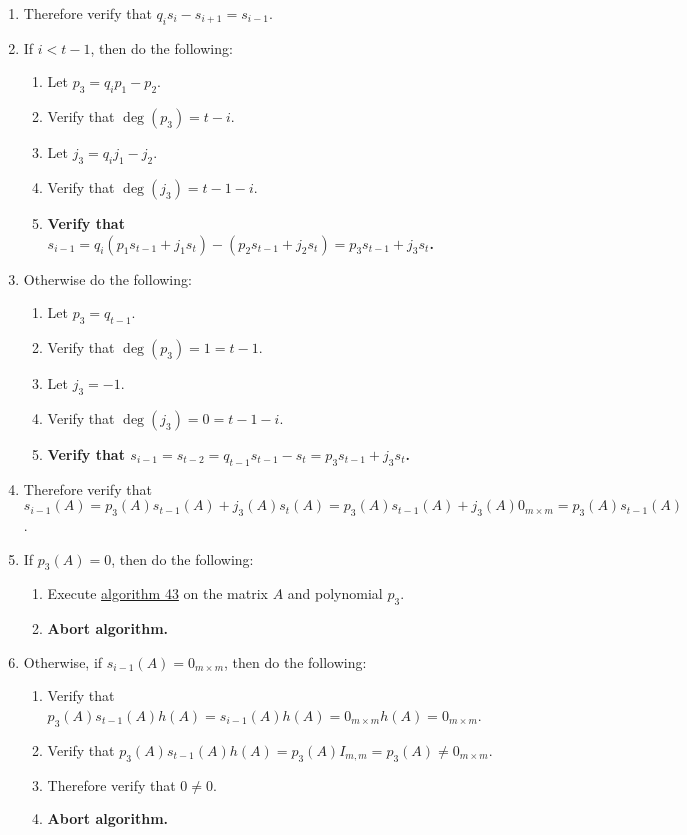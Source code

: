 \documentclass[twocolumn]{article}
\begin{document}
\begin{enumerate}
\begin{enumerate}
					\item Therefore verify that $q_is_i-s_{i+1}=s_{i-1}$.
					\item If $i<t-1$, then do the following:
					\begin{enumerate}
					  \item Let $p_3=q_ip_1-p_2$.
					  \item Verify that $\deg(p_3)=t-i$.
					  \item Let $j_3=q_ij_1-j_2$.
					  \item Verify that $\deg(j_3)=t-1-i$.
						\item \textbf{Verify that $s_{i-1}=q_i(p_1s_{t-1}+j_1s_t)-(p_2s_{t-1}+j_2s_t)=p_3s_{t-1}+j_3s_t$.}
					\end{enumerate}
					\item Otherwise do the following:
					\begin{enumerate}
					  \item Let $p_3=q_{t-1}$.
					  \item Verify that $\deg(p_3)=1=t-1$.
					  \item Let $j_3=-1$.
					  \item Verify that $\deg(j_3)=0=t-1-i$.
						\item \textbf{Verify that $s_{i-1}=s_{t-2}=q_{t-1}s_{t-1}-s_t=p_3s_{t-1}+j_3s_t$.}
					\end{enumerate}
					\item Therefore verify that $s_{i-1}(A)=p_3(A)s_{t-1}(A)+j_3(A)s_t(A)=p_3(A)s_{t-1}(A)+j_3(A)0_{m\times m}=p_3(A)s_{t-1}(A)$.
					\item If $p_3(A)=0$, then do the following:
					\begin{enumerate}
						\item Execute \hyperref[sec:algorithm 43]{algorithm 43} on the matrix $A$ and polynomial $p_3$.
						\item \textbf{Abort algorithm.}
					\end{enumerate}
					\item Otherwise, if $s_{i-1}(A)=0_{m\times m}$, then do the following:
					\begin{enumerate}
						\item Verify that $p_3(A)s_{t-1}(A)h(A)=s_{i-1}(A)h(A)=0_{m\times m}h(A)=0_{m\times m}$.
						\item Verify that $p_3(A)s_{t-1}(A)h(A)=p_3(A)I_{m,m}=p_3(A)\ne0_{m\times m}$.
						\item Therefore verify that $0\ne 0$.
						\item \textbf{Abort algorithm.}

\end{enumerate}
\end{enumerate}
\end{enumerate}
\end{document}

